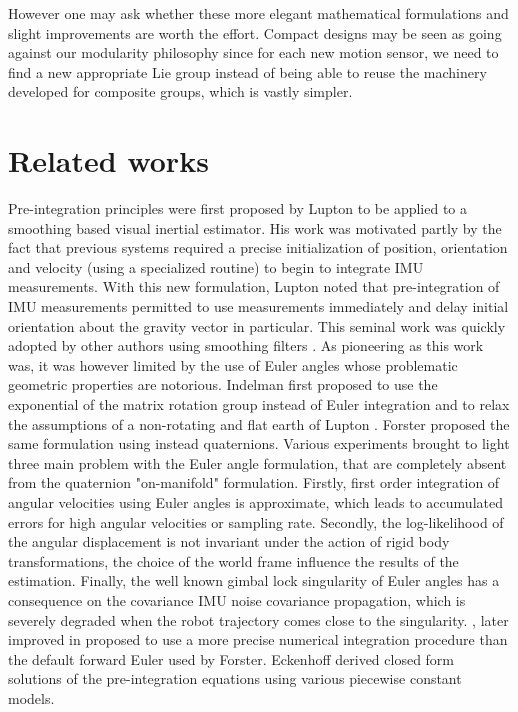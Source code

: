 However one may ask whether these more elegant mathematical formulations and slight improvements are worth the effort. Compact designs may be seen as going against
our modularity philosophy since for each new motion sensor, we need to find a new appropriate Lie group instead of being able to reuse the machinery developed
for composite groups, which is vastly simpler.

\section{Related works}


Pre-integration principles were first proposed by Lupton \cite{lupton-09} to be applied to a smoothing based visual inertial estimator. His work was motivated partly 
by the fact that previous systems required a precise initialization of position, orientation and velocity (using a specialized routine) to begin to integrate IMU measurements. 
With this new formulation, Lupton noted that pre-integration of IMU measurements permitted to use measurements immediately and delay initial orientation about the gravity
vector in particular. 
This seminal work was quickly adopted by other authors using smoothing filters \cite{carlone2014eliminating}. As pioneering as this work was, it was however 
limited by the use of Euler angles whose problematic geometric properties are notorious. Indelman \cite{Indelman-2013-7768} first proposed to use the exponential of the 
matrix rotation group instead of Euler integration and to relax the assumptions of a non-rotating and flat earth of Lupton \cite{lupton-09}. Forster \cite{forster2015imu, forster2017-TRO}
proposed the same formulation using instead quaternions. Various experiments brought to light three main problem with the Euler angle formulation, that are completely absent 
from the quaternion "on-manifold" formulation. Firstly, first order integration of angular velocities using Euler angles is approximate, which leads to accumulated errors 
for high angular velocities or sampling rate.  Secondly, the log-likelihood of the angular displacement is not invariant under the action of rigid body transformations, 
\eg the choice of the world frame influence the results of the estimation. Finally, the well known gimbal lock singularity of Euler angles has a consequence 
on the covariance IMU noise covariance propagation, which is severely degraded when the robot trajectory comes close to the singularity. 
\cite{shen2015tightly}, later improved in \cite{qin2018vins} proposed to use a more precise numerical integration procedure than the default forward Euler used by Forster. 
Eckenhoff \cite{eckenhoff2019closed} derived closed form solutions of the pre-integration equations using various piecewise constant models.

